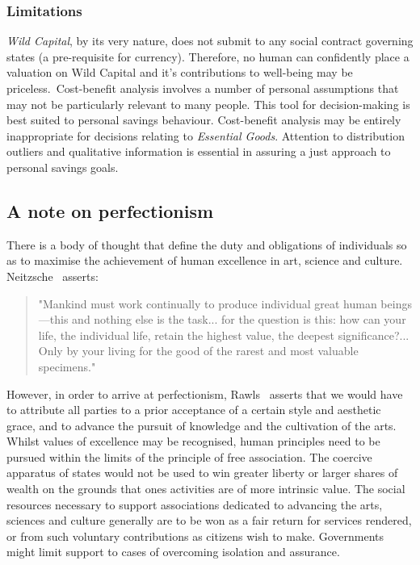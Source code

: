 \documentclass[11pt, oneside]{article}   	%
\begin{document}
\subsubsection{Limitations}

\emph{Wild Capital}, by its very nature, does not submit to any social contract governing states (a pre-requisite for currency).
Therefore, no human can confidently place a valuation on Wild Capital and it's contributions to well-being may be priceless.\
Cost-benefit analysis involves a number of personal assumptions that may not be particularly relevant to many people. This tool for decision-making is best suited to personal savings behaviour.
Cost-benefit analysis may be entirely inappropriate for decisions relating to \emph{Essential Goods}.
Attention to distribution outliers and qualitative information is essential in assuring a just approach to personal savings goals.

\subsection{A note on perfectionism}

There is a body of thought that define the duty and obligations of individuals so as to maximise the achievement of human excellence in art, science and culture. Neitzsche~\cite{gam1} asserts:

\begin{quote}
"Mankind must work continually to produce individual great human beings---this and nothing else is the task... for the question is this: how can your life, the individual life, retain the highest value, the deepest significance?... Only by your living for the good of the rarest and most valuable specimens."
\end{quote}
However, in order to arrive at perfectionism, Rawls~\cite{jr1} asserts that we would have to attribute all parties to a prior acceptance of a certain style and aesthetic grace, and to advance the pursuit of knowledge and the cultivation of the arts.
Whilst values of excellence may be recognised, human principles need to be pursued within the limits of the principle of free association.
The coercive apparatus of states would not be used to win greater liberty or larger shares of wealth on the grounds that ones activities are of more intrinsic value.
The social resources necessary to support associations dedicated to advancing the arts, sciences and culture generally are to be won as a fair return for services rendered, or from such voluntary contributions as citizens wish to make.
Governments might limit support to cases of overcoming isolation and assurance.
\end{document}
